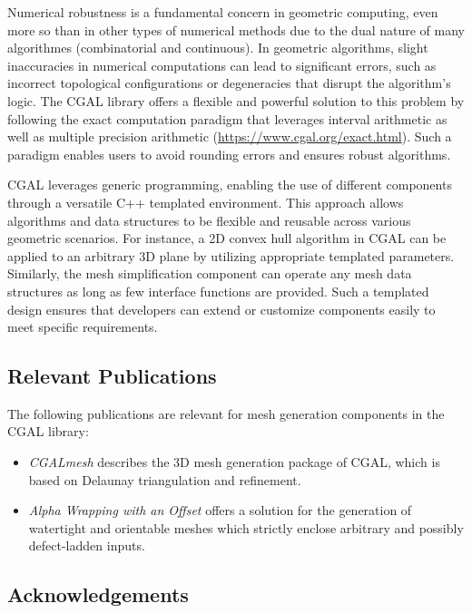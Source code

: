 Numerical robustness is a fundamental concern in geometric computing, even more so than in other types of numerical methods due to the dual nature of many algorithmes (combinatorial and continuous).
In geometric algorithms, slight inaccuracies in numerical computations can lead to significant errors, such as incorrect topological configurations or degeneracies that disrupt the algorithm's logic.
The CGAL library offers a flexible and powerful solution to this problem by following the exact computation paradigm that leverages interval arithmetic as well as multiple precision arithmetic (\url{https://www.cgal.org/exact.html}). Such a paradigm enables users to avoid rounding errors and ensures robust algorithms.

CGAL leverages generic programming, enabling the use of different components through a versatile C++ templated environment.
This approach allows algorithms and data structures to be flexible and reusable across various geometric scenarios.
For instance, a 2D convex hull algorithm in CGAL can be applied to an arbitrary 3D plane by utilizing appropriate templated parameters. Similarly, the mesh simplification component can operate any mesh data structures as long as few interface functions are provided.
Such a templated design ensures that developers can extend or customize components easily to meet specific requirements.


\subsection{Relevant Publications}
\label{sec:CGAL:publications}

The following publications are relevant for mesh generation components in the CGAL library:

\begin{itemize}
\item \textit{CGALmesh} \cite{jamin_cgalmesh_2015} describes the 3D mesh generation package of CGAL, which is based on Delaunay triangulation and refinement.
\item \textit{Alpha Wrapping with an Offset} \cite{portaneri_alpha_2022} offers a solution for the generation of watertight and orientable meshes which strictly enclose arbitrary and possibly defect-ladden inputs.
\end{itemize}


\subsection{Acknowledgements}
\label{sec::CGAL:acknowledgements}

